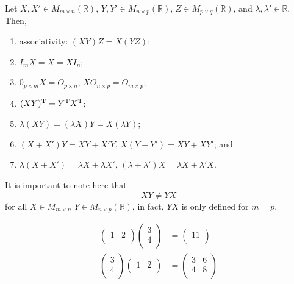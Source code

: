 \begin{proposition}
Let $X,X'\in M_{m\times n}(\mathbb R)$, $Y,Y'\in M_{n\times p}(\mathbb R)$, $Z\in M_{p\times q}(\mathbb R)$, and $\lambda,\lambda'\in\mathbb R$. Then,
    \begin{enumerate}
        \item associativity: $(XY)Z=X(YZ)$;
        \item $I_mX=X=XI_n$;
        \item $0_{p\times m}X=O_{p\times n}$, $XO_{n\times p}=O_{m\times p}$;
        \item $(XY)^{\rm T}=Y^{\rm T}X^{\rm T}$;
        \item $\lambda(XY)=(\lambda X)Y=X(\lambda Y)$;
        \item $(X+X')Y=XY+X'Y$, $X(Y+Y')=XY+XY'$; and
        \item $\lambda(X+X')=\lambda X+\lambda X'$, $(\lambda+\lambda')X=\lambda X+\lambda' X$.
    \end{enumerate}
\end{proposition}

\begin{remark}
    It is important to note here that \[XY\neq YX\] for all $X\in M_{m\times n}$ $Y\in M_{n\times p}(\mathbb R)$, in fact, $YX$ is only defined for $m=p$.
\end{remark}

\begin{example}
    \begin{align*}
        \begin{pmatrix}
            1&2\\
        \end{pmatrix}
        \begin{pmatrix}
            3\\4\\
        \end{pmatrix}
        &=
        \begin{pmatrix}
            11\\
        \end{pmatrix}
        \\
        \begin{pmatrix}
            3\\4\\
        \end{pmatrix}
        \begin{pmatrix}
            1&2\\
        \end{pmatrix}
        &=
        \begin{pmatrix}
            3&6\\4&8\\
        \end{pmatrix}
    \end{align*}
\end{example}

